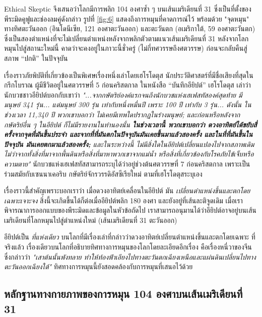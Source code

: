 \documentclass[10pt,twocolumn,letterpaper]{article}
\begin{document}
Ethical Skeptic จึงเสนอว่าโลกมีการพลิก 104 องศาซ้ำ ๆ บนเส้นเมริเดียนที่ 31 ซึ่งเป็นที่ตั้งของพีระมิดคูฟูและช่องลมคู่ดังกล่าว รูปที่ \ref{fig:6} แสดงถึงการหมุนที่คาดการณ์ไว้ พร้อมด้วย "จุดหมุน" ทางทิศตะวันออก (อินโดนีเซีย, 121 องศาตะวันออก) และตะวันตก (อเมริกาใต้, 59 องศาตะวันตก) ซึ่งเป็นสองตำแหน่งที่จะไม่เปลี่ยนตำแหน่งหลังจากพลิกตัวตามแนวเส้นเมริเดียนที่ 31  หลังจากโลกหมุนไปสู่สถานะใหม่นี้ คาดว่าจะคงอยู่ในภาวะนี้ชั่วครู่ (ไม่กี่ทศวรรษถึงศตวรรษ) ก่อนจะกลับคืนสู่สภาพ “ปกติ” ในปัจจุบัน \cite{150}

เรื่องราวภัยพิบัติที่เกี่ยวข้องเป็นพิเศษเรื่องหนึ่งเล่าโดยเฮโรโดตุส นักประวัติศาสตร์ที่มีชื่อเสียงที่สุดในกรีกโบราณ ผู้มีชีวิตอยู่ในศตวรรษที่ 5 ก่อนคริสตกาล \cite{31} ในหนังสือ “บันทึกอียิปต์” เฮโรโดตุส เล่าว่า นักบวชชาวอียิปต์บอกกับเขาว่า \textit{"...จากกษัตริย์องค์แรกจนถึงนักบวชแห่งเฮเฟสทัสองค์สุดท้าย มีมนุษย์ 341 รุ่น... แต่มนุษย์ 300 รุ่น เท่ากับหนึ่งหมื่นปี เพราะ 100 ปี เท่ากับ 3 รุ่น... ดังนั้น ในช่วงเวลา 11,340 ปี พวกเขาบอกว่า ไม่เคยมีเทพใดปรากฏในร่างมนุษย์; และก่อนหรือหลังจากกษัตริย์อื่น ๆ ในอียิปต์ ก็ไม่มีรายงานในทำนองนั้น \textbf{ในช่วงเวลานี้ พวกเขาบอกว่า ดวงอาทิตย์ได้ขยับสี่ครั้งจากจุดที่มันขึ้นประจำ และจากที่ที่มันตกในปัจจุบันมันเคยขึ้นมาแล้วสองครั้ง  และในที่ที่มันขึ้นในปัจจุบัน มันเคยตกมาแล้วสองครั้ง;} และในระหว่างนี้ ไม่มีสิ่งใดในอียิปต์เปลี่ยนแปลงไปจากสภาพเดิม ไม่ว่าจากทั้งสิ่งที่มาจากพื้นดินหรือสิ่งที่มาหาพวกเขาจากแม่น้ำ หรือสิ่งที่เกี่ยวข้องกับโรคภัยไข้เจ็บหรือความตาย"} \cite{32} นักบวชแห่งเฮเฟสทัสสามารถระบุได้ว่าอยู่ช่วงต้นศตวรรษที่ 7 ก่อนคริสตกาล เพราะเป็นร่วมสมัยกับเซนนาเคอริบ กษัตริย์จักรวรรดิอัสซีเรียใหม่ ตามที่เฮโรโดตุสระบุเอง \cite{32,33,34}

เรื่องราวนี้สำคัญเพราะบอกเราว่า เมื่อดวงอาทิตย์เคลื่อนในอียิปต์ มัน \textit{เปลี่ยนตำแหน่งขึ้นและตกโดยเฉพาะเจาะจง} สิ่งนี้จะเกิดขึ้นได้ก็ต่อเมื่ออียิปต์พลิก 180 องศา และยังอยู่ที่เส้นละติจูดเดิม เมื่อเราพิจารณาการออกแบบของพีระมิดและข้อมูลในหัวข้อถัดไป เราสามารถอนุมานได้ว่าอียิปต์อาจอยู่บนเส้นเมริเดียนที่โลกหมุนไปสู่ตำแหน่งใหม่ (เส้นเมริเดียนที่ 31 ตะวันออก)

อียิปต์เป็น \textit{ที่แห่งเดียว} บนโลกที่มีเรื่องเล่าที่กล่าวว่าดวงอาทิตย์เปลี่ยนตำแหน่งขึ้นและตกโดยเฉพาะ ที่จริงแล้ว เรื่องเดียวบนโลกที่อธิบายทิศทางการหมุนของโลกโดยละเอียดอีกเรื่อง คือเรื่องหนี่วาของจีนซึ่งกล่าวว่า \textit{"เสาต้นนั้นพังทลาย ทำให้ท้องฟ้าเอียงไปทางตะวันตกเฉียงเหนือและแผ่นดินเปลี่ยนไปทางตะวันออกเฉียงใต้"} \cite{8} ทิศทางการหมุนนี้ยังสอดคล้องกับการหมุนที่เสนอไว้ด้วย

\subsection{หลักฐานทางกายภาพของการหมุน 104 องศาบนเส้นเมริเดียนที่ 31}
\end{document}
